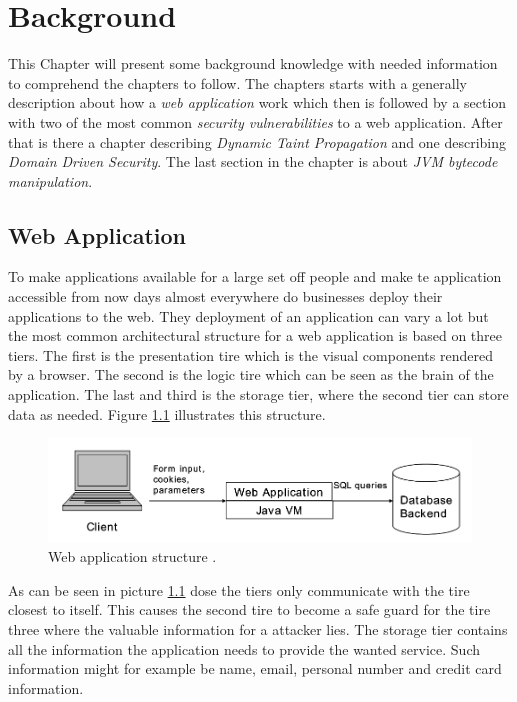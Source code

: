 \chapter{Background}
This Chapter will present some background knowledge with needed information to comprehend the chapters to follow. The chapters starts with a generally description about how a \textit{web application} work which then is followed by a section with two of the most common \textit{security vulnerabilities} to a web application. After that is there a chapter describing \textit{Dynamic Taint Propagation} and one describing \textit{Domain Driven Security}. The last section in the chapter is about \textit{JVM bytecode manipulation}.


\section{Web Application}
To make applications available for a large set off people and make te application accessible from now days almost everywhere do businesses deploy their applications to the web. They deployment of an application can vary a lot but the most common architectural structure for a web application is based on three tiers. The first is the presentation tire which is the visual components rendered by a browser. The second is the logic tire which can be seen as the brain of the application. The last and third is the storage tier, where the second tier can store data as needed. \parencite{JustinClarke-Salt2009SIAa} Figure \ref{fig:webApplication-Haldar} illustrates this structure.

\begin{figure}
  \centering
  \includegraphics[width=\textwidth]{images/webApplication-Haldar.png}
  \caption{Web application structure \cite{Haldar}.}
  \label{fig:webApplication-Haldar}
\end{figure}

As can be seen in picture \ref{fig:webApplication-Haldar} dose the tiers only communicate with the tire closest to itself. This causes the second tire to become a safe guard for the tire three where the valuable information for a attacker lies. The storage tier contains all the information the application needs to provide the wanted service. Such information might for example be name, email, personal number and credit card information. \parencite{JustinClarke-Salt2009SIAa}

